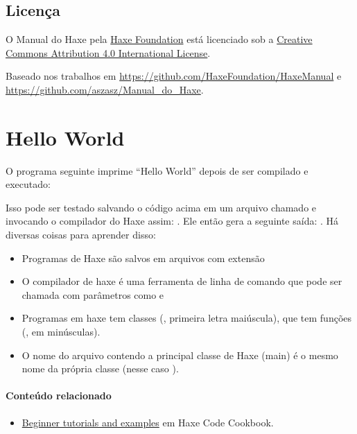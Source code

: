 \subsection{Licença}
\label{introduction-license}

O Manual do Haxe pela \href{http://haxe.org/foundation}{Haxe Foundation} está licenciado sob a \href{http://creativecommons.org/licenses/by/4.0/}{Creative Commons Attribution 4.0 International License}.

Baseado nos trabalhos em \href{https://github.com/HaxeFoundation/HaxeManual}{https://github.com/HaxeFoundation/HaxeManual} e\\ \href{https://github.com/aszasz/Manual\_do\_Haxe}{https://github.com/aszasz/Manual\_do\_Haxe}.

\section{Hello World}
\label{introduction-hello-world}

O programa seguinte imprime ``Hello World'' depois de ser compilado e executado:

Isso pode ser testado salvando o código acima em um arquivo chamado  e invocando o compilador do Haxe assim: . Ele então gera a seguinte saída: . Há diversas coisas para aprender disso:

\begin{itemize}
	\item Programas de Haxe são salvos em arquivos com extensão 
	\item O compilador de haxe é uma ferramenta de linha de comando que pode ser chamada com parâmetros como  e 
	\item Programas em haxe tem classes (, primeira letra maiúscula), que tem funções (, em minúsculas).
    \item O nome do arquivo contendo a principal classe de Haxe (main) é o mesmo nome da própria classe (nesse caso ).
\end{itemize}

\paragraph{Conteúdo relacionado}
\begin{itemize}
	\item \href{http://code.haxe.org/category/beginner/}{Beginner tutorials and examples} em Haxe Code Cookbook.
\end{itemize}

